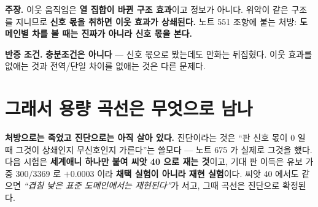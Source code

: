 \documentclass[10pt,a4paper]{article}
\newcommand{\claim}[2]{\begin{claimbox}\textbf{주장.} #1\par\smallskip
  \textcolor{gray!70}{\textbf{반증 조건.} #2}\end{claimbox}}
\begin{document}
\claim{이웃 움직임은 \textbf{열 집합이 바뀐 구조 효과}이고 정보가 아니다. 위약이 같은
구조를 지니므로 \textbf{신호 몫을 취하면 이웃 효과가 상쇄된다.} 노트 551 조항에 붙는
처방: \textbf{도메인별 차를 볼 때는 진짜가 아니라 신호 몫을 본다.}}
{\textbf{충분조건은 아니다} --- 신호 몫으로 봤는데도 만화는 뒤집혔다. 이웃 효과를
없애는 것과 전역/단일 차이를 없애는 것은 다른 문제다.}

\section{그래서 용량 곡선은 무엇으로 남나}

\textbf{처방으로는 죽었고 진단으로는 아직 살아 있다.} 진단이라는 것은 ``판 신호 몫이
0 일 때 그것이 상쇄인지 무신호인지 가른다''는 쓸모다 --- 노트 675 가 실제로 그것을
했다. 다음 시험은 \textbf{세계애니 하나만 붙여 씨앗 40 으로 재는 것}이고, 기대 판
이득은 유보 가중 $300/3369$ 로 $+0.0003$ 이라 \textbf{채택 실험이 아니라 재현
실험}이다. 씨앗 40 에서도 같으면 \emph{``겹침 낮은 표준 도메인에서는 재현된다''}가
서고, 그때 곡선은 진단으로 확정된다.
\end{document}
